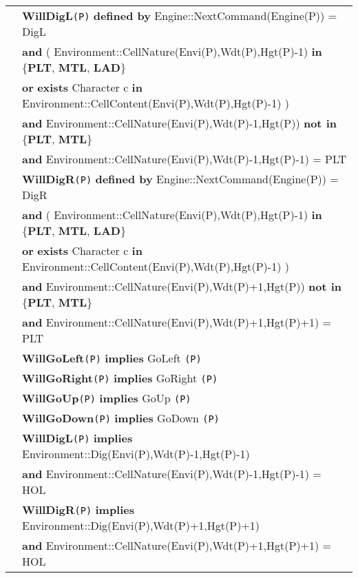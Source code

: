 \documentclass{article}
\begin{document}
\begin{tabular}{rl}
&\textbf{WillDigL}\texttt{(P)} \textbf{defined by}  \textrm{Engine::NextCommand(Engine(P))  = DigL}\\
& \quad \textbf{and} ( \textrm{Environment::CellNature(Envi(P),Wdt(P),Hgt(P)-1)} \textbf{in} \{\textbf{PLT}, \textbf{MTL}, \textbf{LAD}\} \\
& \quad\quad\quad\quad \textbf{or} \textbf{exists} \textrm{Character} c \textbf{in} \textrm{Environment::CellContent(Envi(P),Wdt(P),Hgt(P)-1)} ) \\
& \quad \textbf{and} \textrm{Environment::CellNature(Envi(P),Wdt(P)-1,Hgt(P))} \textbf{not in} \{\textbf{PLT}, \textbf{MTL}\} \\
& \quad \textbf{and} \textrm{Environment::CellNature(Envi(P),Wdt(P)-1,Hgt(P)-1)} = \textrm{PLT} \\

&\textbf{WillDigR}\texttt{(P)} \textbf{defined by}  \textrm{Engine::NextCommand(Engine(P))  = DigR}\\
& \quad \textbf{and} ( \textrm{Environment::CellNature(Envi(P),Wdt(P),Hgt(P)-1)} \textbf{in} \{\textbf{PLT}, \textbf{MTL}, \textbf{LAD}\} \\
& \quad\quad\quad\quad \textbf{or} \textbf{exists} \textrm{Character} c \textbf{in} \textrm{Environment::CellContent(Envi(P),Wdt(P),Hgt(P)-1)} ) \\
& \quad \textbf{and} \textrm{Environment::CellNature(Envi(P),Wdt(P)+1,Hgt(P))} \textbf{not in} \{\textbf{PLT}, \textbf{MTL}\} \\
& \quad \textbf{and} \textrm{Environment::CellNature(Envi(P),Wdt(P)+1,Hgt(P)+1)} = \textrm{PLT} \\

& \textbf{WillGoLeft}\texttt{(P)}  \textbf{implies} \textrm{GoLeft} \texttt{(P)}\\ 

& \textbf{WillGoRight}\texttt{(P)}  \textbf{implies} \textrm{GoRight} \texttt{(P)}\\ 

& \textbf{WillGoUp}\texttt{(P)}  \textbf{implies} \textrm{GoUp} \texttt{(P)}\\ 

& \textbf{WillGoDown}\texttt{(P)}  \textbf{implies} \textrm{GoDown} \texttt{(P)}\\

& \textbf{WillDigL}\texttt{(P)} \textbf{implies}
\textrm{Environment::Dig(Envi(P),Wdt(P)-1,Hgt(P)-1)}\\
& \quad \textbf{and} \textrm{Environment::CellNature(Envi(P),Wdt(P)-1,Hgt(P)-1)} = \textrm{HOL} \\

& \textbf{WillDigR}\texttt{(P)} \textbf{implies} \textrm{Environment::Dig(Envi(P),Wdt(P)+1,Hgt(P)+1)}\\

& \quad \textbf{and} \textrm{Environment::CellNature(Envi(P),Wdt(P)+1,Hgt(P)+1)} = \textrm{HOL} \\

\end{tabular}
\end{document}
